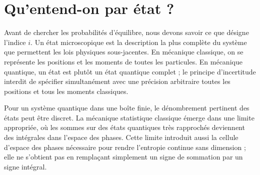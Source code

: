 \begin{classroomqa}
\end{classroomqa}

\section{Qu’entend-on par état ?}

Avant de chercher les probabilités d’équilibre, nous devons savoir ce que désigne l’indice \(i\). Un état microscopique est la description la plus complète du système que permettent les lois physiques sous-jacentes. En mécanique classique, on se représente les positions et les moments de toutes les particules. En mécanique quantique, un état est plutôt un état quantique complet ; le principe d’incertitude interdit de spécifier simultanément avec une précision arbitraire toutes les positions et tous les moments classiques.

Pour un système quantique dans une boîte finie, le dénombrement pertinent des états peut être discret. La mécanique statistique classique émerge dans une limite appropriée, où les sommes sur des états quantiques très rapprochés deviennent des intégrales dans l’espace des phases. Cette limite introduit aussi la cellule d’espace des phases nécessaire pour rendre l’entropie continue sans dimension ; elle ne s’obtient pas en remplaçant simplement un signe de sommation par un signe intégral.

\begin{classroomqa}
\end{classroomqa}

